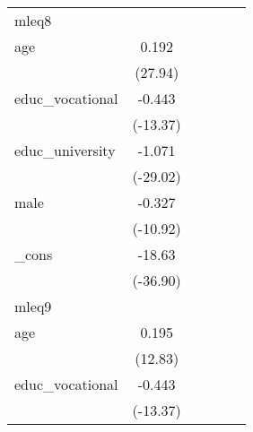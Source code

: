 {\begin{tabular}{l*{5}{c}}
\hline
mleq8       &                     &                     &                     &                     &                     \\
age         &       0.192\sym{***}&                     &                     &                     &                     \\
            &     (27.94)         &                     &                     &                     &                     \\
[1em]
educ\_vocational&      -0.443\sym{***}&                     &                     &                     &                     \\
            &    (-13.37)         &                     &                     &                     &                     \\
[1em]
educ\_university&      -1.071\sym{***}&                     &                     &                     &                     \\
            &    (-29.02)         &                     &                     &                     &                     \\
[1em]
male        &      -0.327\sym{***}&                     &                     &                     &                     \\
            &    (-10.92)         &                     &                     &                     &                     \\
[1em]
\_cons      &      -18.63\sym{***}&                     &                     &                     &                     \\
            &    (-36.90)         &                     &                     &                     &                     \\
\hline
mleq9       &                     &                     &                     &                     &                     \\
age         &       0.195\sym{***}&                     &                     &                     &                     \\
            &     (12.83)         &                     &                     &                     &                     \\
[1em]
educ\_vocational&      -0.443\sym{***}&                     &                     &                     &                     \\
            &    (-13.37)         &                     &                     &                     &                     \\

\end{tabular}}
